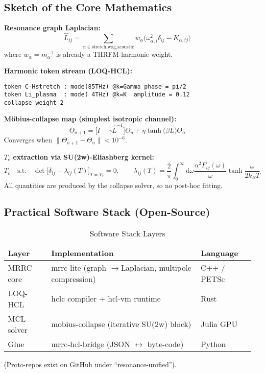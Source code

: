 \documentclass[11pt,a4paper]{article}
\begin{document}
\subsection{Sketch of the Core Mathematics}
\label{subsec:sketch_core_math}

\textbf{Resonance graph Laplacian:}
\begin{equation}
\hat{L}_{ij} = \sum_{\alpha\in{\text{stretch,wag,acoustic}}} w_{\alpha} \bigl(\omega_{\alpha,i}^2 \delta_{ij}-K_{\alpha,ij}\bigr)
\end{equation}
where $w_\alpha = m_\alpha^{-1}$ is already a THRFM harmonic weight.

\textbf{Harmonic token stream (LOQ-HCL):}
\begin{verbatim}
token C-Hstretch : mode(85THz) @k=Gamma phase = pi/2
token Li_plasma  : mode( 4THz) @k=K  amplitude = 0.12
collapse weight 2
\end{verbatim}

\textbf{Möbius-collapse map (simplest isotropic channel):}
\begin{equation}
\Theta_{n+1} = \bigl[I-\gamma \hat{L}^{-1}\bigr]\Theta_n +\eta \tanh\bigl(\beta\hat{L}\bigr)\Theta_n
\end{equation}
Converges when $\|\Theta_{n+1}-\Theta_n\| < 10^{-6}$.

\textbf{$T_c$ extraction via SU(2w)-Eliashberg kernel:}
\begin{equation}
T_c \quad\text{s.t.}\quad \det\bigl[\delta_{ij}-\lambda_{ij}(T)\bigr]_{T=T_c}=0, \qquad \lambda_{ij}(T)=\frac{2}{\pi} \int_0^{\infty} \mathrm{d}\omega \frac{\alpha^2F_{ij}(\omega)}{\omega} \tanh\frac{\omega}{2k_BT}
\end{equation}
All quantities are produced by the collapse solver, so no post-hoc fitting.

\subsection{Practical Software Stack (Open-Source)}
\label{subsec:software_stack}
\begin{table}[htbp]
\centering
\caption{Software Stack Layers}
\label{tab:software_stack}
\begin{tabularx}{\textwidth}{l X l}
\toprule
\textbf{Layer} & \textbf{Implementation} & \textbf{Language} \\
\midrule
MRRC-core & mrrc-lite (graph $\rightarrow$Laplacian, multipole compression) & C++ / PETSc \\
LOQ-HCL & hclc compiler + hcl-vm runtime & Rust \\
MCL solver & mobius-collapse (iterative SU(2w) block) & Julia GPU \\
Glue & mrrc-hcl-bridge (JSON $\leftrightarrow$ byte-code) & Python \\
\bottomrule
\end{tabularx}
\end{table}
(Proto-repos exist on GitHub under “resonance-unified”).
\end{document}

